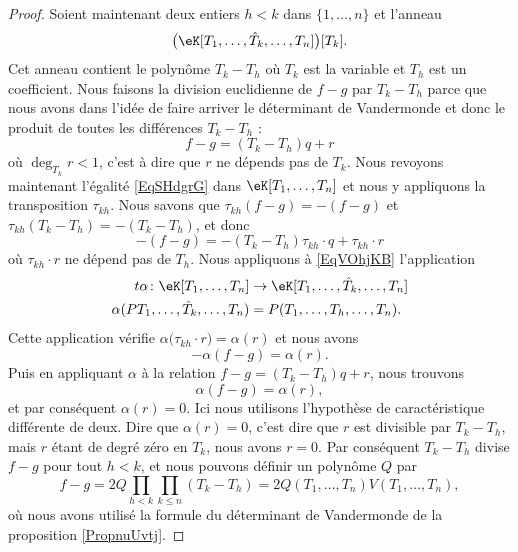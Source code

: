 \begin{proof}
    Soient maintenant deux entiers \( h<k\) dans \( \{ 1,\ldots, n \}\) et l'anneau
    \begin{equation}
        \big( \eK[T_1,\ldots, \hat T_k,\ldots, T_n] \big)[T_k].
    \end{equation}
    Cet anneau contient le polynôme \( T_k-T_h\) où \( T_k\) est la variable et \( T_h\) est un coefficient. Nous faisons la division euclidienne de \( f-g\) par  \( T_k-T_h\) parce que nous avons dans l'idée de faire arriver le déterminant de Vandermonde et donc le produit de toutes les différences \( T_k-T_h\) :
    \begin{equation}    \label{EqSHdgrG}
        f-g=(T_k-T_h)q+r
    \end{equation}
    où \( \deg_{T_k}r<1\), c'est à dire que \( r\) ne dépends pas de \( T_k\). Nous revoyons maintenant l'égalité \eqref{EqSHdgrG} dans \( \eK[T_1,\ldots, T_n]\) et nous y appliquons la transposition \( \tau_{kh}\). Nous savons que \( \tau_{kh}(f-g)=-(f-g)\) et \( \tau_{kh}(T_k-T_h)=-(T_k-T_h)\), et donc
    \begin{equation}    \label{EqVOhjKB}
        -(f-g)=-(T_k-T_h)\tau_{kh}\cdot   q+\tau_{kh}\cdot r
    \end{equation}
    où \(\tau_{kh}\cdot r\) ne dépend pas de \( T_h\). Nous appliquons à \eqref{EqVOhjKB} l'application
    \begin{equation}
        \begin{aligned}
            t\alpha\colon \eK[T_1,\ldots, T_n]&\to \eK[T_1,\ldots, \hat T_k,\ldots, T_n] \\
            \alpha(PT_1,\ldots, \hat T_k,\ldots, T_n)&=P(T_1,\ldots, T_h,\ldots, T_n). 
        \end{aligned}
    \end{equation}
    Cette application vérifie \( \alpha\big( \tau_{kh}\cdot r \big)=\alpha(r)\) et nous avons
    \begin{equation}
        -\alpha(f-g)=\alpha(r).
    \end{equation}
    Puis en appliquant \( \alpha\) à la relation \( f-g=(T_k-T_h)q+r\), nous trouvons
    \begin{equation}
        \alpha(f-g)=\alpha(r),
    \end{equation}
    et par conséquent \( \alpha(r)=0\). Ici nous utilisons l'hypothèse de caractéristique différente de deux. Dire que \( \alpha(r)=0\), c'est dire que \( r\) est divisible par \( T_k-T_h\), mais \( r\) étant de degré zéro en \( T_k\), nous avons \( r=0\). Par conséquent \( T_k-T_h\) divise \( f-g\) pour tout \( h<k\), et nous pouvons définir un polynôme \( Q\) par
    \begin{equation}    \label{EqrnbgdA}
        f-g=2Q\prod_{h<k}\prod_{k\leq n}(T_k-T_h)=2Q(T_1,\ldots, T_n)V(T_1,\ldots, T_n),
    \end{equation}
    où nous avons utilisé la formule du déterminant de Vandermonde de la proposition \ref{PropnuUvtj}.


\end{proof}
